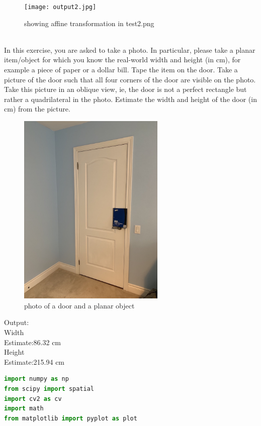 \documentclass{exam}
\begin{document}
\begin{questions}
\begin{parts}
\begin{figure}[H]
\caption{showing affine transformation in test2.png}
\centering
\texttt{[image: output2.jpg]}
\end{figure}

\end{parts}\\


\question In this exercise, you are asked to take a photo. In particular, please take a planar item/object for which you know the real-world width and height (in cm), for example a piece of paper or a dollar bill. Tape the item on the door. Take a picture of the door such that all four corners of the door are visible on the photo. Take this picture in an oblique view, ie, the door is not a perfect rectangle but rather a quadrilateral in the photo. Estimate the width and height of the door (in cm) from the picture.\\

\begin{figure}[H]
\caption{photo of a door and a planar object}
\centering
\includegraphics[width=7cm]{door.jpeg}
\end{figure}

Output:\\
Width\\
Estimate:86.32 cm\\

Height\\
Estimate:215.94 cm\\

\begin{lstlisting}[language=python, frame=single]
import numpy as np
from scipy import spatial
import cv2 as cv
import math
from matplotlib import pyplot as plot


\end{lstlisting}
\end{questions}
\end{document}
